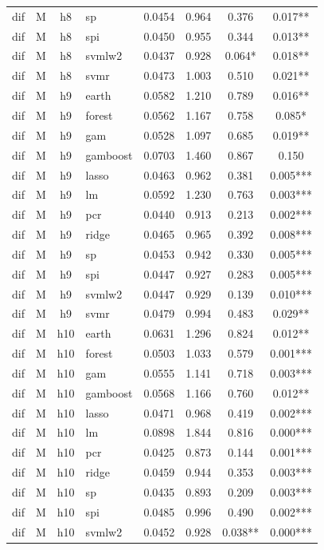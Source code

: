 \begin{ThreePartTable}
\begin{longtable}[t]{llclcccc}
dif & M & h8 & sp & 0.0454 & 0.964 & 0.376 & 0.017**\\
dif & M & h8 & spi & 0.0450 & 0.955 & 0.344 & 0.013**\\
dif & M & h8 & svmlw2 & 0.0437 & 0.928 & 0.064* & 0.018**\\
dif & M & h8 & svmr & 0.0473 & 1.003 & 0.510 & 0.021**\\
\addlinespace
dif & M & h9 & earth & 0.0582 & 1.210 & 0.789 & 0.016**\\
dif & M & h9 & forest & 0.0562 & 1.167 & 0.758 & 0.085*\\
dif & M & h9 & gam & 0.0528 & 1.097 & 0.685 & 0.019**\\
dif & M & h9 & gamboost & 0.0703 & 1.460 & 0.867 & 0.150\\
dif & M & h9 & lasso & 0.0463 & 0.962 & 0.381 & 0.005***\\
dif & M & h9 & lm & 0.0592 & 1.230 & 0.763 & 0.003***\\
dif & M & h9 & pcr & 0.0440 & 0.913 & 0.213 & 0.002***\\
dif & M & h9 & ridge & 0.0465 & 0.965 & 0.392 & 0.008***\\
dif & M & h9 & sp & 0.0453 & 0.942 & 0.330 & 0.005***\\
dif & M & h9 & spi & 0.0447 & 0.927 & 0.283 & 0.005***\\
dif & M & h9 & svmlw2 & 0.0447 & 0.929 & 0.139 & 0.010***\\
dif & M & h9 & svmr & 0.0479 & 0.994 & 0.483 & 0.029**\\
\addlinespace
dif & M & h10 & earth & 0.0631 & 1.296 & 0.824 & 0.012**\\
dif & M & h10 & forest & 0.0503 & 1.033 & 0.579 & 0.001***\\
dif & M & h10 & gam & 0.0555 & 1.141 & 0.718 & 0.003***\\
dif & M & h10 & gamboost & 0.0568 & 1.166 & 0.760 & 0.012**\\
dif & M & h10 & lasso & 0.0471 & 0.968 & 0.419 & 0.002***\\
dif & M & h10 & lm & 0.0898 & 1.844 & 0.816 & 0.000***\\
dif & M & h10 & pcr & 0.0425 & 0.873 & 0.144 & 0.001***\\
dif & M & h10 & ridge & 0.0459 & 0.944 & 0.353 & 0.003***\\
dif & M & h10 & sp & 0.0435 & 0.893 & 0.209 & 0.003***\\
dif & M & h10 & spi & 0.0485 & 0.996 & 0.490 & 0.002***\\
dif & M & h10 & svmlw2 & 0.0452 & 0.928 & 0.038** & 0.000***\\

\end{longtable}
\end{ThreePartTable}
